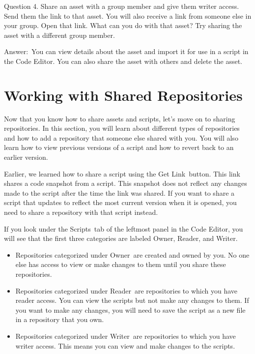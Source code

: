 \documentclass[
  letterpaper,
  DIV=11,
  numbers=noendperiod]{scrreprt}
\providecommand{\tightlist}{%
  \setlength{\itemsep}{0pt}\setlength{\parskip}{0pt}}\usepackage{longtable,booktabs,array}
\begin{document}
Question 4. Share an asset with a group member and give them writer
access. Send them the link to that asset. You will also receive a link
from someone else in your group. Open that link. What can you do with
that asset? Try sharing the asset with a different group member.

Answer:~You can view details about the asset and import it for use in a
script in the Code Editor. You can also share the asset with others and
delete the asset.

\hypertarget{working-with-shared-repositories}{%
\section{Working with Shared
Repositories}\label{working-with-shared-repositories}}

Now that you know how to share assets and scripts, let's move on to
sharing repositories. In this section, you will learn about different
types of repositories and how to add a repository that someone else
shared with you. You will also learn how to view previous versions of a
script and how to revert back to an earlier version.

Earlier, we learned how to share a script using the Get Link~button.
This link shares a code snapshot from a script. This snapshot does not
reflect any changes made to the script after the time the link was
shared. If you want to share a script that updates to reflect the most
current version when it is opened, you need to share a repository with
that script instead.

If you look under the Scripts~tab of the leftmost panel in the Code
Editor, you will see that the first three categories are labeled Owner,
Reader, and Writer.

\begin{itemize}
\tightlist
\item
  Repositories categorized under Owner~are created and owned by you. No
  one else has access to view or make changes to them until you share
  these repositories.
\item
  Repositories categorized under Reader~are repositories to which you
  have reader access. You can view the scripts but not make any changes
  to them. If you want to make any changes, you will need to save the
  script as a new file in a repository that you own.
\item
  Repositories categorized under Writer~are repositories to which you
  have writer access. This means you can view and make changes to the
  scripts.
\end{itemize}
\end{document}
